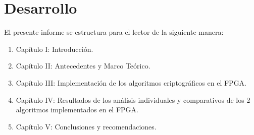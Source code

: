 \section{Desarrollo}

El presente informe se estructura para el lector de la siguiente manera:

\begin{enumerate}
\item Capítulo I: Introducción.

\item Capítulo II: Antecedentes y Marco Teórico. 

\item Capítulo III: Implementación de los algoritmos criptográficos en el FPGA.

\item Capítulo IV: Resultados de los análisis individuales y comparativos de los 2 algoritmos implementados en el FPGA.

\item Capítulo V: Conclusiones y recomendaciones.

\end{enumerate}